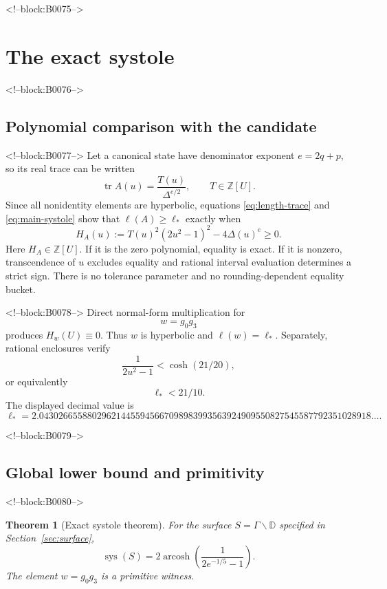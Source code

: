 \documentclass[11pt,a4paper]{article}
\newtheorem{theorem}{Theorem}[section]
\theoremstyle{definition}
\newcommand{\D}{\mathbb D}
\newcommand{\Z}{\mathbb Z}
\newcommand{\tr}{\operatorname{tr}}
\newcommand{\arcosh}{\operatorname{arcosh}}
\newcommand{\sys}{\operatorname{sys}}
\newcommand{\length}{\ell}
\begin{document}
<!--block:B0075-->
\section{The exact systole}
\label{sec:systole}

<!--block:B0076-->
\subsection{Polynomial comparison with the candidate}

<!--block:B0077-->
Let a canonical state have denominator exponent \(e=2q+p\), so its real
trace can be written
\[
 \tr A(u)=\frac{T(u)}{\Delta^{e/2}},\qquad T\in\Z[U].
\]
Since all nonidentity elements are hyperbolic, equations
\eqref{eq:length-trace} and \eqref{eq:main-systole} show that
\(\length(A)\geq\length_*\) exactly when
\begin{equation}\label{eq:H}
 H_A(u):=T(u)^2(2u^2-1)^2-4\Delta(u)^e\geq0.
\end{equation}
Here \(H_A\in\Z[U]\).  If it is the zero polynomial, equality is exact.  If it
is nonzero, transcendence of \(u\) excludes equality and rational interval
evaluation determines a strict sign.  There is no tolerance parameter and no
rounding-dependent equality bucket.

<!--block:B0078-->
Direct normal-form multiplication for
\begin{equation}\label{eq:witness}
 w=g_0g_3
\end{equation}
produces \(H_w(U)\equiv0\).  Thus \(w\) is hyperbolic and
\(\length(w)=\length_*\).  Separately, rational enclosures verify
\[
 \frac{1}{2u^2-1}<\cosh(21/20),
\]
or equivalently
\begin{equation}\label{eq:candidate-cutoff}
 \length_*<21/10.
\end{equation}
The displayed decimal value is
\[
 \length_*=2.043026655880296214455945667098983993563924909550827545587792351028918\ldots.
\]

<!--block:B0079-->
\subsection{Global lower bound and primitivity}

<!--block:B0080-->
\begin{theorem}[Exact systole theorem]\label{thm:systole}
For the surface \(S=\Gamma\backslash\D\) specified in
Section~\ref{sec:surface},
\[
 \sys(S)=2\arcosh\!\left(\frac{1}{2e^{-1/5}-1}\right).
\]
The element \(w=g_0g_3\) is a primitive witness.
\end{theorem}
\end{document}

